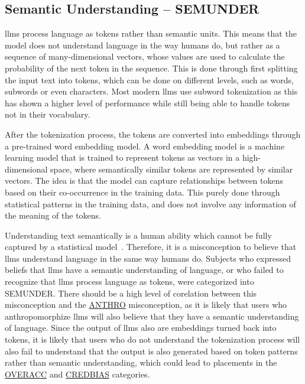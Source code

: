 \subsection{Semantic Understanding -- SEMUNDER}\label{semunder}
\gls{llms} process language as tokens rather than semantic units. This means that the model does not understand language in the way humans do, but rather as a sequence of many-dimensional vectors, whose values are used to calculate the probability of the next token in the sequence. This is done through first splitting the input text into tokens, which can be done on different levels, such as words, subwords or even characters. Most modern \gls{llms} use subword tokenization as this has shown a higher level of performance while still being able to handle tokens not in their vocabulary. 

After the tokenization process, the tokens are converted into embeddings through a pre-trained word embedding model. A word embedding model is a machine learning model that is trained to represent tokens as vectors in a high-dimensional space, where semantically similar tokens are represented by similar vectors. The idea is that the model can capture relationships between tokens based on their co-occurrence in the training data. This purely done through statistical patterns in the training data, and does not involve any information of the meaning of the tokens.

Understanding text semantically is a human ability which cannot be fully captured by a statistical model~\cite{bender_climbing_2020,bender_dangers_2021}. Therefore, it is a misconception to believe that \gls{llms} understand language in the same way humans do. Subjects who expressed beliefs that \gls{llms} have a semantic understanding of language, or who failed to recognize that \gls{llms} process language as tokens, were categorized into SEMUNDER\@. There should be a high level of corelation between this misconception and the \hyperref[anthro]{ANTHRO} misconception, as it is likely that users who anthropomorphize \gls{llms} will also believe that they have a semantic understanding of language. 
Since the output of \gls{llms} also are embeddings turned back into tokens, it is likely that users who do not understand the tokenization process will also fail to understand that the output is also generated based on token patterns rather than semantic understanding, which could lead to placements in the \hyperref[overacc]{OVERACC} and \hyperref[credbias]{CREDBIAS} categories.

